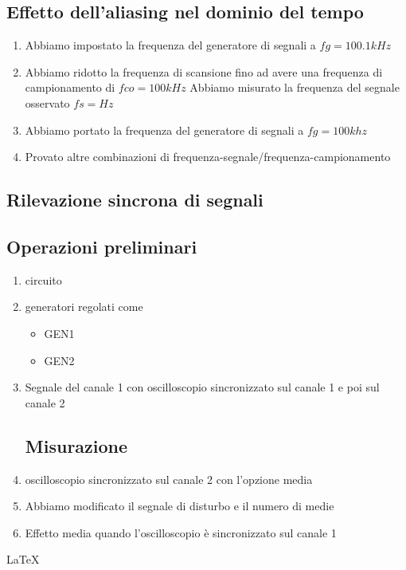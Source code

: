 \documentclass[a4paper]{article}
\begin{document}
\subsection{Effetto dell’aliasing nel dominio del tempo}
 \begin{enumerate}
  \item Abbiamo impostato la frequenza del generatore di segnali a \(fg=100.1 kHz\)
  \item Abbiamo ridotto la frequenza di scansione fino ad avere una frequenza di campionamento di \(fco=100 kHz\) Abbiamo misurato la frequenza del segnale osservato \(fs= Hz\)
  \item Abbiamo portato la frequenza del generatore di segnali a \(fg=100khz\)
  \item Provato altre combinazioni di frequenza-segnale/frequenza-campionamento
\end{enumerate}


\begin{tcolorbox}[breakable,colback=cyan,colframe=cyan]
\section*{Rilevazione sincrona di segnali}
\end{tcolorbox}


\subsection{Operazioni preliminari}
 \begin{enumerate}
  \item circuito
  \item generatori regolati come
   \begin{itemize}
     \item GEN1
     \item GEN2
   \end{itemize}
  \item Segnale del canale 1 con oscilloscopio sincronizzato sul canale 1 e poi sul canale 2

\subsection{Misurazione}
  \item oscilloscopio sincronizzato sul canale 2 con l'opzione media
  \item Abbiamo modificato il segnale di disturbo e il numero di medie
  \item Effetto media quando l'oscilloscopio è sincronizzato sul canale 1
 \end{enumerate}

\noindent \LaTeX
\end{document}
